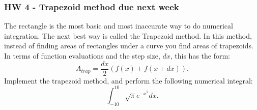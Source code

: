 \documentclass{beamer}
\begin{document}
\begin{frame}
  \frametitle{HW 4 - Trapezoid method due next week}
  The rectangle is the most basic and most inaccurate way to do
  numerical integration. The next best way is called the Trapezoid method.
  In this method, instead of finding areas of rectangles under a curve you find
  areas of trapezoids. In terms of function evaluations and the step
  size, $dx$, this has the form:
  \begin{equation*}
    A_{trap} = \frac{dx}{2}(f(x)+f(x+dx)).
  \end{equation*}
  Implement the trapezoid method, and perform the following numerical integral:
  \begin{equation*}
    \int_{-10}^{10}\sqrt{\pi}e^{-x^2}dx.
  \end{equation*}
\end{frame}
\end{document}
